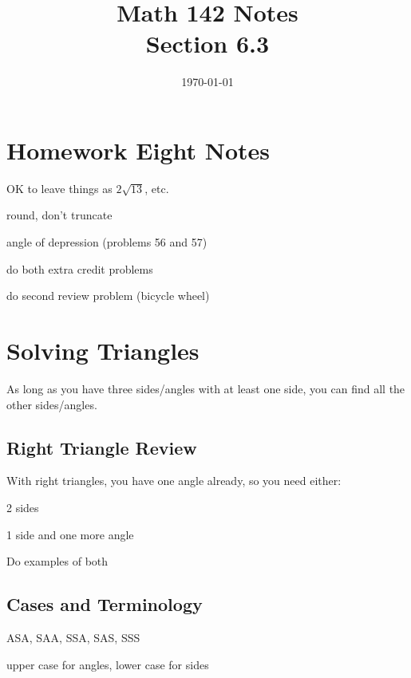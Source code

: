 \documentclass{exam}
\title{Math 142 Notes \\ Section 6.3}
\date{\today}
\begin{document}
  \maketitle
  \tableofcontents

  \section{Homework Eight Notes}
  \begin{itemize*}
    \item OK to leave things as $2 \sqrt{13}$, etc.
    \item round, don't truncate
    \item angle of depression (problems 56 and 57)
    \item do both extra credit problems
    \item do second review problem (bicycle wheel)
  \end{itemize*}

  \section{Solving Triangles}

  As long as you have three sides/angles with at least one side, you can find all the other sides/angles.

  \subsection{Right Triangle Review}

  With right triangles, you have one angle already, so you need either:
  \begin{itemize*}
    \item 2 sides
    \item 1 side and one more angle
  \end{itemize*}

  Do examples of both

  \subsection{Cases and Terminology}

  \begin{itemize*}
    \item ASA, SAA, SSA, SAS, SSS
    \item upper case for angles, lower case for sides
  \end{itemize*}
\end{document}
